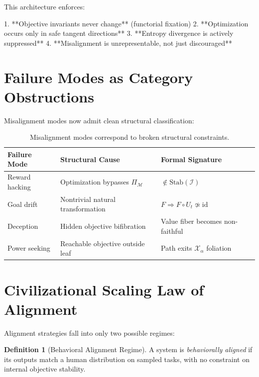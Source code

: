 \documentclass[11pt,a4paper]{article}
\theoremstyle{plain}
\theoremstyle{definition}
\newtheorem{definition}[theorem]{Definition}
\theoremstyle{remark}
\numberwithin{equation}{section}
\newcommand{\X}{\mathcal{X}}
\newcommand{\Stab}{\text{Stab}}
\begin{document}
This architecture enforces:

1. **Objective invariants never change** (functorial fixation)
2. **Optimization occurs only in safe tangent directions**
3. **Entropy divergence is actively suppressed**
4. **Misalignment is unrepresentable, not just discouraged**

\section{Failure Modes as Category Obstructions}

Misalignment modes now admit clean structural classification:

\begin{table}[H]
\centering
\begin{tabular}{lll}
\toprule
Failure Mode & Structural Cause & Formal Signature \\
\midrule
Reward hacking & Optimization bypasses $\Pi_{\mathcal{M}}$ & $\notin \Stab(\mathcal{I})$ \\
Goal drift & Nontrivial natural transformation & $F \Rightarrow F\circ U_t \not\simeq \mathrm{id}$ \\
Deception & Hidden objective bifibration & Value fiber becomes non-faithful \\
Power seeking & Reachable objective outside leaf & Path exits $\X_\alpha$ foliation \\
\bottomrule
\end{tabular}
\caption{Misalignment modes correspond to broken structural constraints.}
\end{table}

\section{Civilizational Scaling Law of Alignment}

Alignment strategies fall into only two possible regimes:

\begin{definition}[Behavioral Alignment Regime]
A system is \emph{behaviorally aligned} if its outputs match a human distribution on sampled tasks, with no constraint on internal objective stability.
\end{definition}
\end{document}

